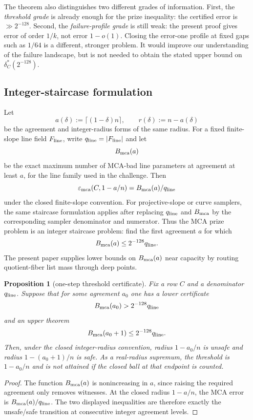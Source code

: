 \documentclass[11pt]{article}
\newtheorem{proposition}[theorem]{Proposition}
\theoremstyle{definition}
\theoremstyle{remark}
\newcommand{\emca}{\varepsilon_{\mathrm{mca}}}
\begin{document}
The theorem also distinguishes two different grades of information.  First, the
\emph{threshold grade} is already enough for the prize inequality: the certified
error is $\gg2^{-128}$.  Second, the \emph{failure-profile grade} is still weak:
the present proof gives error of order $1/k$, not error $1-o(1)$.  Closing the
error-one profile at fixed gaps such as $1/64$ is a different, stronger problem.
It would improve our understanding of the failure landscape, but is not needed
to obtain the stated upper bound on $\delta_C^*(2^{-128})$.

\subsection{Integer-staircase formulation}

Let
\[
        a(\delta):=\lceil(1-\delta)n\rceil,
        \qquad r(\delta):=n-a(\delta)
\]
be the agreement and integer-radius forms of the same radius.  For a fixed finite-slope line
field $F_{\rm line}$, write $q_{\rm line}=|F_{\rm line}|$ and let
\[
        B_{\rm mca}(a)
\]
be the exact maximum number of MCA-bad line parameters at agreement at least
$a$, for the line family used in the challenge.  Then
\[
        \emca(C,1-a/n)=B_{\rm mca}(a)/q_{\rm line}
\]
under the closed finite-slope convention.  For projective-slope or curve samplers, the same staircase formulation applies after replacing $q_{\rm line}$ and $B_{\rm mca}$ by the corresponding sampler denominator and numerator.  Thus the MCA prize problem is an
integer staircase problem: find the first agreement $a$ for which
\[
        B_{\rm mca}(a)\le 2^{-128}q_{\rm line}.
\]
The present paper supplies lower bounds on $B_{\rm mca}(a)$ near capacity by
routing quotient-fiber list mass through deep points.

\begin{proposition}[one-step threshold certificate]\label{prop:onestep}
Fix a row $C$ and a denominator $q_{\rm line}$.  Suppose that for some agreement
$a_0$ one has a lower certificate
\[
        B_{\rm mca}(a_0)>2^{-128}q_{\rm line}
\]
and an upper theorem
\[
        B_{\rm mca}(a_0+1)\le2^{-128}q_{\rm line}.
\]
Then, under the closed integer-radius convention, radius $1-a_0/n$ is unsafe and
radius $1-(a_0+1)/n$ is safe.  As a real-radius supremum, the threshold is
$1-a_0/n$ and is not attained if the closed ball at that endpoint is counted.
\end{proposition}

\begin{proof}
The function $B_{\rm mca}(a)$ is nonincreasing in $a$, since raising the
required agreement only removes witnesses.  At the closed radius $1-a/n$, the
MCA error is $B_{\rm mca}(a)/q_{\rm line}$.  The two displayed inequalities are
therefore exactly the unsafe/safe transition at consecutive integer agreement
levels.
\end{proof}
\end{document}
